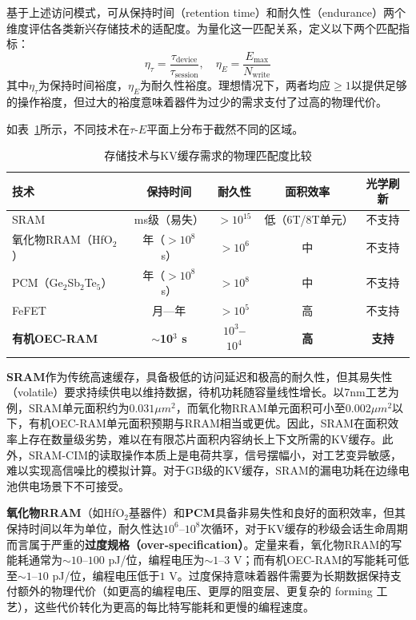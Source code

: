 基于上述访问模式，可从保持时间（retention time）和耐久性（endurance）两个维度评估各类新兴存储技术的适配度。为量化这一匹配关系，定义以下两个匹配指标：
\begin{equation}
\eta_{\tau} = \frac{\tau_{\text{device}}}{\tau_{\text{session}}}, \quad \eta_{E} = \frac{E_{\text{max}}}{N_{\text{write}}}
\label{eq:match_metrics}
\end{equation}
其中$\eta_{\tau}$为保持时间裕度，$\eta_{E}$为耐久性裕度。理想情况下，两者均应$\geq 1$以提供足够的操作裕度，但过大的裕度意味着器件为过少的需求支付了过高的物理代价。

如表~\ref{tab:kv_tech_match}所示，不同技术在$\tau$-$E$平面上分布于截然不同的区域。

\begin{table}[htbp]
\centering
\caption{存储技术与KV缓存需求的物理匹配度比较}
\label{tab:kv_tech_match}
\begin{tabular}{lcccc}
\toprule
技术 & 保持时间 & 耐久性 & 面积效率 & 光学刷新 \\
\midrule
SRAM & ms级（易失） & $>10^{15}$ & 低（6T/8T单元） & 不支持 \\
氧化物RRAM（HfO$_2$） & 年（$>10^8$ s） & $>10^{6}$ & 中 & 不支持 \\
PCM（Ge$_2$Sb$_2$Te$_5$） & 年（$>10^8$ s） & $>10^{8}$ & 中 & 不支持 \\
FeFET & 月—年 & $>10^{5}$ & 高 & 不支持 \\
\textbf{有机OEC-RAM} & \textbf{$\sim$10$^3$ s} & \textbf{$10^3$–$10^4$} & \textbf{高} & \textbf{支持} \\
\bottomrule
\end{tabular}
\end{table}

\textbf{SRAM}作为传统高速缓存，具备极低的访问延迟和极高的耐久性，但其易失性（volatile）要求持续供电以维持数据，待机功耗随容量线性增长。以7nm工艺为例，SRAM单元面积约为$0.031 \mu m^2$，而氧化物RRAM单元面积可小至$0.002 \mu m^2$以下，有机OEC-RAM单元面积预期与RRAM相当或更优。因此，SRAM在面积效率上存在数量级劣势，难以在有限芯片面积内容纳长上下文所需的KV缓存。此外，SRAM-CIM的读取操作本质上是电荷共享，信号摆幅小，对工艺变异敏感，难以实现高信噪比的模拟计算。对于GB级的KV缓存，SRAM的漏电功耗在边缘电池供电场景下不可接受。

\textbf{氧化物RRAM}（如HfO$_2$基器件）和\textbf{PCM}具备非易失性和良好的面积效率，但其保持时间以年为单位，耐久性达$10^6$–$10^8$次循环，对于KV缓存的秒级会话生命周期而言属于严重的\textbf{过度规格（over-specification）}。定量来看，氧化物RRAM的写能耗通常为$\sim$$10$–$100$ pJ/位，编程电压为$\sim$$1$–$3$ V；而有机OEC-RAM的写能耗可低至$\sim$$1$–$10$ pJ/位，编程电压低于$1$ V。过度保持意味着器件需要为长期数据保持支付额外的物理代价（如更高的编程电压、更厚的阻变层、更复杂的 forming 工艺），这些代价转化为更高的每比特写能耗和更慢的编程速度。


